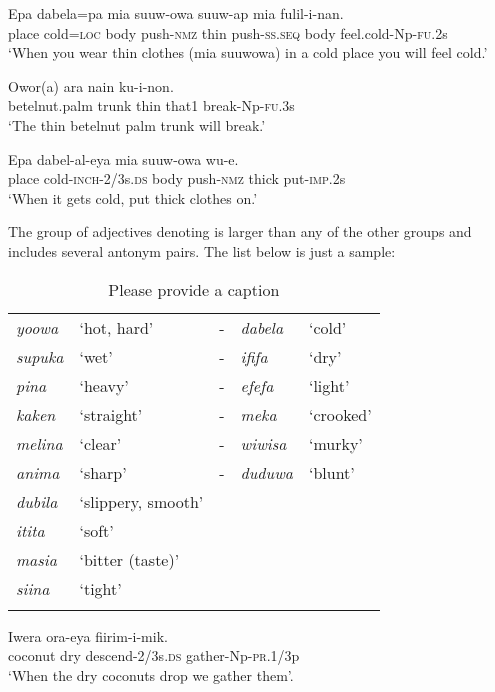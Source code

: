 \ea%
\label{ex:3:x1756}
\gll Epa dabela=pa mia suuw-owa  suuw-ap mia fulil-i-nan.\\
place cold=\textsc{loc} body push-\textsc{nmz} thin push-\textsc{ss}.\textsc{seq} body feel.cold-Np-\textsc{fu}.2s\\
\glt`When you wear thin clothes (mia suuwowa) in a cold place you will feel cold.' 
\z

\ea%
\label{ex:3:x76}
\gll Owor(a) ara   nain ku-i-non. \\
betelnut.palm trunk thin that1 break-Np-\textsc{fu}.3s\\
\glt`The thin betelnut palm trunk will break.'
\z

\ea%
\label{ex:3:x77}
\gll Epa dabel-al-eya mia suuw-owa   wu-e. \\
place cold-\textsc{inch}-2/3s.\textsc{ds} body push-\textsc{nmz} thick put-\textsc{imp}.2s\\
\glt`When it gets cold, put thick clothes on.'
\z

The group of adjectives denoting  is larger than any of the other groups and includes several antonym pairs. The list below is just a sample:

\begin{table}
\caption{Please provide a caption}
 
\begin{tabular}{>{\itshape}llc>{\itshape}ll}
\mytoprule
yoowa &`hot, hard' &- &dabela &`cold'\\
supuka &`wet' &- &ififa &`dry'\\
pina &`heavy' &- &efefa &`light'\\
kaken &`straight' &- &meka &`crooked'\\
melina &`clear' &- &wiwisa &`murky'\\
anima &`sharp' &- &duduwa &`blunt'\\
dubila &`slippery, smooth'&&&\\
itita &`soft'&&&\\
masia &`bitter (taste)'&&&\\
siina &`tight'&&&\\
\mybottomrule
\end{tabular}
\end{table}

\ea%
\label{ex:3:x78}
\gll Iwera  ora-eya fiirim-i-mik. \\
coconut dry descend-2/3s.\textsc{ds} gather-Np-\textsc{pr}.1/3p\\
\glt`When the dry coconuts drop we gather them'.
\z


